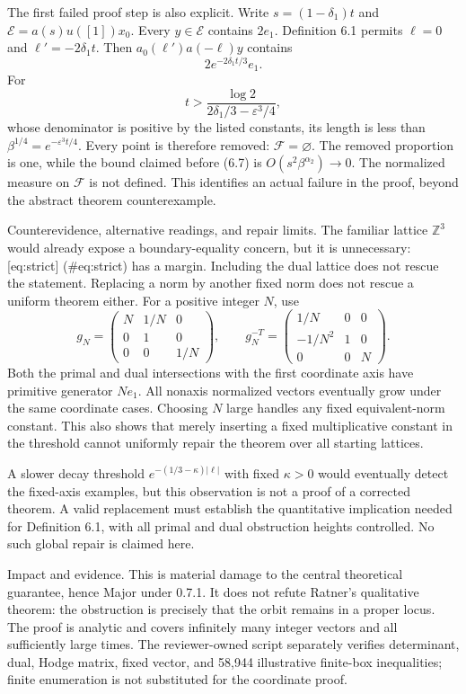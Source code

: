 \documentclass[10pt]{article}
\begin{document}
The first failed proof step is also explicit. Write \(s=(1-\delta_1)t\) and \(\mathcal E=a(s)u([1])x_0\). Every \(y\in\mathcal E\) contains \(2e_1\). Definition 6.1 permits \(\ell=0\) and \(\ell'=-2\delta_1t\). Then \(a_0(\ell')a(-\ell)y\) contains \[2e^{-2\delta_1t/3}e_1.\] For \[t>\frac{\log2}{2\delta_1/3-\varepsilon^3/4},\] whose denominator is positive by the listed constants, its length is less than \(\beta^{1/4}=e^{-\varepsilon^3t/4}\). Every point is therefore removed: \(\mathcal F=\varnothing\). The removed proportion is one, while the bound claimed before (6.7) is \(O(s^2\beta^{\alpha_2})\to0\). The normalized measure on \(\mathcal F\) is not defined. This identifies an actual failure in the proof, beyond the abstract theorem counterexample.\par
Counterevidence, alternative readings, and repair limits. The familiar lattice \(\mathbb Z^3\) would already expose a boundary-equality concern, but it is unnecessary: [eq:strict] (\#eq:strict) has a margin. Including the dual lattice does not rescue the statement. Replacing a norm by another fixed norm does not rescue a uniform theorem either. For a positive integer \(N\), use \[g_N=\begin{pmatrix}N&1/N&0\\0&1&0\\0&0&1/N\end{pmatrix},
 \qquad
 g_N^{-T}=\begin{pmatrix}1/N&0&0\\-1/N^2&1&0\\0&0&N\end{pmatrix}.\] Both the primal and dual intersections with the first coordinate axis have primitive generator \(Ne_1\). All nonaxis normalized vectors eventually grow under the same coordinate cases. Choosing \(N\) large handles any fixed equivalent-norm constant. This also shows that merely inserting a fixed multiplicative constant in the threshold cannot uniformly repair the theorem over all starting lattices.\par
A slower decay threshold \(e^{-(1/3-\kappa)|\ell|}\) with fixed \(\kappa>0\) would eventually detect the fixed-axis examples, but this observation is not a proof of a corrected theorem. A valid replacement must establish the quantitative implication needed for Definition 6.1, with all primal and dual obstruction heights controlled. No such global repair is claimed here.\par
Impact and evidence. This is material damage to the central theoretical guarantee, hence Major under 0.7.1. It does not refute Ratner’s qualitative theorem: the obstruction is precisely that the orbit remains in a proper locus. The proof is analytic and covers infinitely many integer vectors and all sufficiently large times. The reviewer-owned script separately verifies determinant, dual, Hodge matrix, fixed vector, and 58,944 illustrative finite-box inequalities; finite enumeration is not substituted for the coordinate proof.\par
\end{document}
